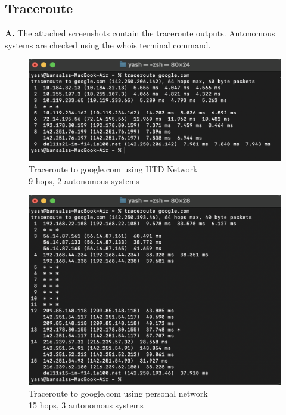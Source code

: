 \documentclass{article}
\begin{document}
\subsection{Traceroute}
\textbf{A.} The attached screenshots contain the traceroute outputs. Autonomous systems are checked using the whois terminal command.
    \begin{figure}[H]
    \centering
    \includegraphics[width=\textwidth]{trace_google_iitd_ipv4.png}
    \caption*{Traceroute to google.com using IITD Network \\
    9 hops, 2 autonomous systems}
    \end{figure}

    \begin{figure}[H]
    \centering
    \includegraphics[width=\textwidth]{trace_google_personal_ipv4.png}
    \caption*{Traceroute to google.com using personal network\\
    15 hops, 3 autonomous systems}
    \end{figure}
    
\end{document}
